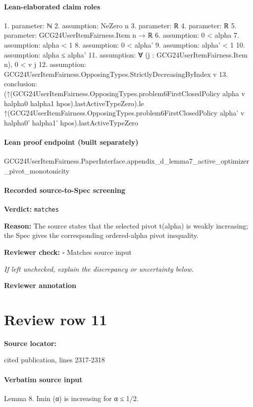 \documentclass[10pt]{article}
\newcommand{\reviewerbox}{%
  \par\noindent\fbox{\parbox{0.96\linewidth}{\rule{0pt}{0.38in}}}\par
}
\newcommand{\reviewmatch}[1]{%
  \par\noindent\textbf{Reviewer check:} $\square$\; #1\par
  \noindent\emph{If left unchecked, explain the discrepancy or uncertainty below.}\par
}
\begin{document}
\paragraph{Lean-elaborated claim roles}\begin{ReviewVerbatim}
1. parameter: ℕ
2. assumption: NeZero n
3. parameter: ℝ
4. parameter: ℝ
5. parameter: GCG24UserItemFairness.Item n → ℝ
6. assumption: 0 < alpha
7. assumption: alpha < 1
8. assumption: 0 < alpha'
9. assumption: alpha' < 1
10. assumption: alpha ≤ alpha'
11. assumption: ∀ (j : GCG24UserItemFairness.Item n), 0 < v j
12. assumption: GCG24UserItemFairness.OpposingTypes.StrictlyDecreasingByIndex v
13. conclusion: (↑(GCG24UserItemFairness.OpposingTypes.problem6FirstClosedPolicy alpha v halpha0 halpha1 hpos).lastActiveTypeZero).le
  ↑(GCG24UserItemFairness.OpposingTypes.problem6FirstClosedPolicy alpha' v halpha0' halpha1' hpos).lastActiveTypeZero
\end{ReviewVerbatim}

\paragraph{Lean proof endpoint (built separately)}\begin{ReviewVerbatim}
GCG24UserItemFairness.PaperInterface.appendix_d_lemma7_active_optimizer_pivot_monotonicity
\end{ReviewVerbatim}

\paragraph{Recorded source-to-Spec screening}
\textbf{Verdict:} \texttt{matches}
\\
{\raggedright
\textbf{Reason:} The source states that the selected pivot t(alpha) is weakly increasing;\allowbreak{} the Spec gives the corresponding ordered-\allowbreak{}alpha pivot inequality.\allowbreak{}
\par}
\reviewmatch{Matches source input}
\noindent\textbf{Reviewer annotation}\par
\reviewerbox
\clearpage
\hypertarget{source-claim-80513579ff0f392a}{}
\section*{Review row 11}
\textbf{Source locator:} {\footnotesize\raggedright cited publication, lines 2317-\allowbreak{}2318\par}
\paragraph{Verbatim source input}
\begin{ReviewVerbatim}
Lemma 8. Imin
(α) is increasing for α ≤ 1/2.
\end{ReviewVerbatim}
\end{document}
